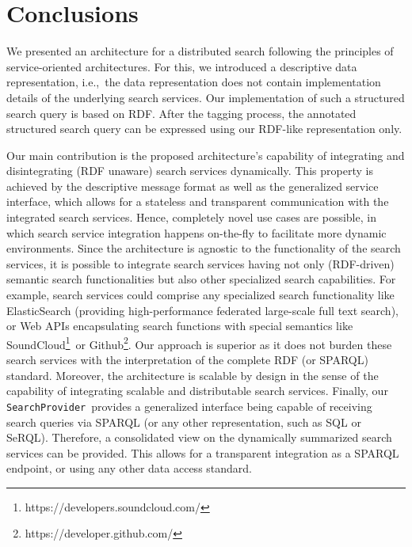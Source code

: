 \documentclass{acm_proc_article-sp}
\newcommand{\code}[1]{\texttt{#1}}
\newcommand{\ie}{i.e.,~}
\begin{document}







\section{Conclusions}\label{sec:conclusion}

We presented an architecture for a distributed search following the principles of service-oriented architectures. 
For this, we introduced a descriptive data representation, \ie the data representation does not contain implementation details of the underlying search services. 
Our implementation of such a structured search query is based on RDF.
After the tagging process, the annotated structured search query can be expressed using our RDF-like representation only.%

Our main contribution is the proposed architecture's capability of integrating and disintegrating (RDF unaware) search services dynamically.
This property is achieved by the descriptive message format as well as the ge\-ne\-ra\-lized service interface, which allows for a stateless and transparent communication with the integrated search services.
Hence, completely novel use cases are possible, in which search service integration happens on-the-fly to facilitate more dynamic environments.
Since the architecture is agnostic to the functionality of the search services, it is possible to integrate search services having not only (RDF-driven) semantic search functionalities but also other specialized search capabilities. 
For example, search services could comprise any specialized search functionality like ElasticSearch (providing high-performance federated large-scale full text search), or Web APIs encapsulating search functions with special semantics like SoundCloud\footnote{https://developers.soundcloud.com/}\ or Github\footnote{https://developer.github.com/}.
Our approach is superior as it does not burden these search services with the interpretation of the complete RDF (or SPARQL) standard.
Moreover, the architecture is scalable by design in the sense of the capability of integrating scalable and distributable search services. 
Finally, our \code{SearchProvider}\ provides a generalized interface being capable of receiving search queries via SPARQL (or any other representation, such as SQL or SeRQL). 
Therefore, a consolidated view on the dynamically summarized search services can be provided.
This allows for a transparent integration as a SPARQL endpoint, or using any other data access standard.
\end{document}
